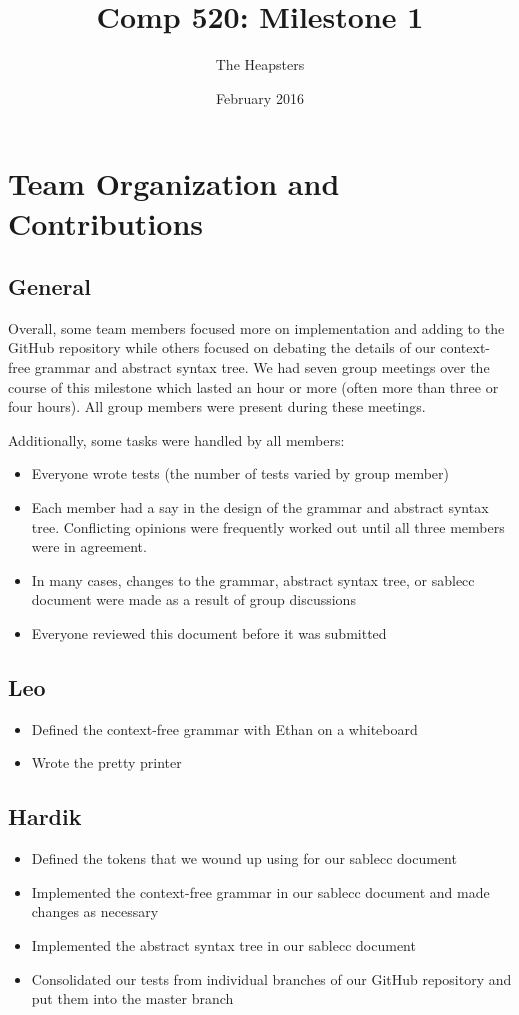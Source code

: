 \documentclass{article}
\title{Comp 520: Milestone 1}
\author{The Heapsters}
\date{February 2016}
\begin{document}
\maketitle

\section*{Team Organization and Contributions}

\subsection*{General}
Overall, some team members focused more on implementation and adding to the GitHub repository while others focused on debating the details of our context-free grammar and abstract syntax tree. We had seven group meetings over the course of this milestone which lasted an hour or more (often more than three or four hours). All group members were present during these meetings.

Additionally, some tasks were handled by all members:

\begin{itemize}
    \item Everyone wrote tests (the number of tests varied by group member)
    \item Each member had a say in the design of the grammar and abstract syntax tree. Conflicting opinions were frequently worked out until all three members were in agreement.
    \item In many cases, changes to the grammar, abstract syntax tree, or sablecc document were made as a result of group discussions
    \item Everyone reviewed this document before it was submitted
\end{itemize}


\subsection*{Leo}

\begin{itemize}
    \item Defined the context-free grammar with Ethan on a whiteboard
    \item Wrote the pretty printer
\end{itemize}

\subsection*{Hardik}
\begin{itemize}
    \item Defined the tokens that we wound up using for our sablecc document
    \item Implemented the context-free grammar in our sablecc document and made changes as necessary
    \item Implemented the abstract syntax tree in our sablecc document
    \item Consolidated our tests from individual branches of our GitHub repository and put them into the master branch
\end{itemize}
\end{document}
